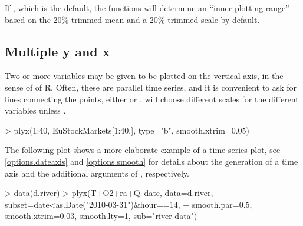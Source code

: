 \documentclass[11pt]{article}
\begin{document}
\begin{Schunk}
\end{Schunk}

If , which is the default, the  functions
will determine an ``inner plotting range'' based on 
the 20\% trimmed mean and a 20\% trimmed scale by default.



\subsection{Multiple y and x}
Two or more variables may be given to be plotted on the vertical axis,
in the sense of  of R.
Often, these are parallel time series, and it is convenient to ask for 
lines connecting the points, either  or .
 will choose different scales for the different variables unless
.

\begin{Schunk}
\begin{Sinput}
> plyx(1:40, EuStockMarkets[1:40,], type="b", smooth.xtrim=0.05)
\end{Sinput}
\end{Schunk}

The following plot shows a more elaborate example of a time series plot,
see \ref{options.dateaxis} and \ref{options.smooth}
for details about the generation of a time axis and
the additional arguments of , respectively.

\begin{Schunk}
\begin{Sinput}
>   data(d.river)
>   plyx(T+O2+ra+Q~date, data=d.river, 
+        subset=date<as.Date("2010-03-31")&hour==14, 
+        smooth.par=0.5, smooth.xtrim=0.03, smooth.lty=1, sub="river data")
\end{Sinput}
\end{Schunk}
\end{document}
